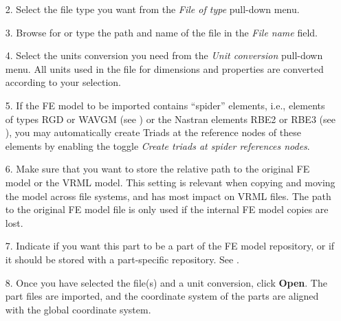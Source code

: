\begin{itemize}
\item[2.]
  Select the file type you want from the {\sl File of type} pull-down menu.

\item[3.]
  Browse for or type the path and name of the file in the {\sl File name} field.


\item[4.]
  Select the units conversion you need from the {\sl Unit conversion}
  pull-down menu. All units used in the file for dimensions and properties
  are converted according to your selection.



\item[5.]
  If the FE model to be imported contains ``spider'' elements, i.e.,
  elements of types RGD or WAVGM (see
  )
  or the Nastran elements RBE2 or RBE3 (see
  ),
  you may automatically create Triads at the
  reference nodes of these elements by enabling the toggle
  {\sl Create triads at spider references nodes}.

\item[6.]
  Make sure that you want to store the relative path to the original FE
  model or the VRML model. This setting is relevant when copying and
  moving the model across file systems, and has most impact on VRML
  files. The path to the original FE model file is only used if the
  internal FE model copies are lost.

\item[7.]
  Indicate if you want this part to be a part of the FE model
  repository, or if it should be stored with a part-specific repository.
  See .

\item[8.]
  Once you have selected the file(s) and a unit conversion, click \textbf{Open}.
  The part files are imported, and the coordinate system of the parts are
  aligned with the global coordinate system.
\end{itemize}

